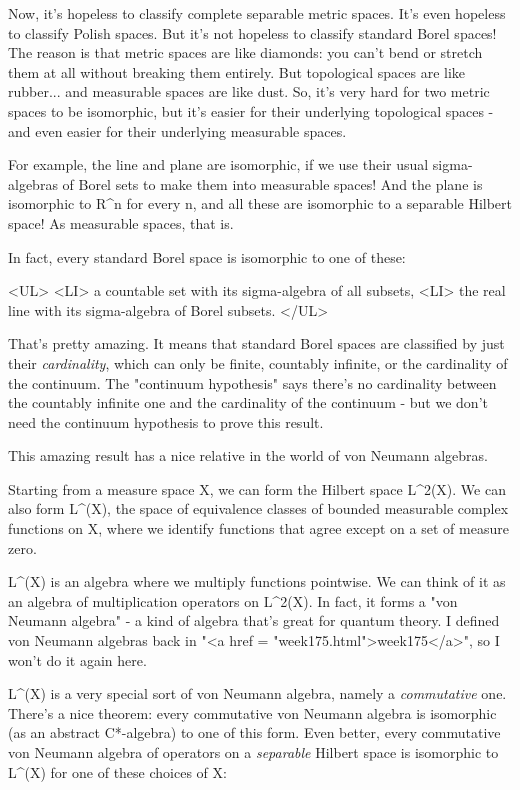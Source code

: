 Now, it's hopeless to classify complete separable metric spaces.
It's even hopeless to classify Polish spaces.  But it's not
hopeless to classify standard Borel spaces!  The reason is that metric
spaces are like diamonds: you can't bend or stretch them at all without
breaking them entirely.  But topological spaces are like rubber... and
measurable spaces are like dust.  So, it's very hard for two metric
spaces to be isomorphic, but it's easier for their underlying
topological spaces - and even easier for their underlying measurable
spaces.  

For example, the line and plane are isomorphic, if we use their 
usual sigma-algebras of Borel sets to make them into measurable
spaces!   And the plane is isomorphic to R^{n} for every n, and all
these are isomorphic to a separable Hilbert space!  As measurable
spaces, that is.

In fact, every standard Borel space is isomorphic to one of these:

<UL>
<LI>
a countable set with its sigma-algebra of all subsets,
<LI>
the real line with its sigma-algebra of Borel subsets.
</UL>

That's pretty amazing.   It means that standard Borel spaces are
classified by just their \emph{cardinality}, which can only be finite,
countably infinite, or the cardinality of the continuum.  The "continuum
hypothesis" says there's no cardinality between the countably infinite
one and the cardinality of the continuum - but we don't need the
continuum hypothesis to prove this result.

This amazing result has a nice relative in the world of von Neumann
algebras.

Starting from a measure space X, we can form the Hilbert space
L^{2}(X).  We can also form L^{\infty }(X), the space
of equivalence classes of bounded measurable complex functions on X,
where we identify functions that agree except on a set of measure
zero.

L^{\infty }(X) is an algebra where we multiply functions
pointwise.  We can think of it as an algebra of multiplication
operators on L^{2}(X).  In fact, it forms a "von Neumann
algebra" - a kind of algebra that's great for quantum theory.  I
defined von Neumann algebras back in "<a href =
"week175.html">week175</a>", so I won't do it again here.

L^{\infty }(X) is a very special sort of von Neumann algebra,
namely a \emph{commutative} one.  There's a nice theorem: every
commutative von Neumann algebra is isomorphic (as an abstract C*-algebra)
to one of this form.
Even better, every commutative von Neumann algebra of operators on a
\emph{separable} Hilbert space is isomorphic 
to L^{\infty }(X) for one of these choices of X:

